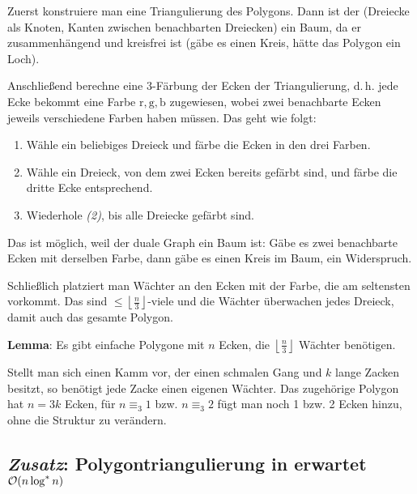 \begin{Beweis}
    Zuerst konstruiere man eine Triangulierung des Polygons.
    Dann ist der 
    (Dreiecke als Knoten, Kanten zwischen benachbarten Dreiecken) ein Baum,
    da er zusammenhängend und kreisfrei ist
    (gäbe es einen Kreis, hätte das Polygon ein Loch).

    Anschließend berechne eine $3$-Färbung der Ecken der Triangulierung,
    d.\,h. jede Ecke bekommt eine Farbe $\text{r}, \text{g}, \text{b}$ zugewiesen,
    wobei zwei benachbarte Ecken jeweils verschiedene Farben haben müssen.
    Das geht wie folgt:
    \begin{enumerate}
        \item
        Wähle ein beliebiges Dreieck und färbe die Ecken in den drei Farben.

        \item
        Wähle ein Dreieck, von dem zwei Ecken bereits gefärbt sind, und färbe die dritte Ecke
        entsprechend.

        \item
        Wiederhole \emph{(2)}, bis alle Dreiecke gefärbt sind.
    \end{enumerate}
    Das ist möglich, weil der duale Graph ein Baum ist:
    Gäbe es zwei benachbarte Ecken mit derselben Farbe, dann gäbe es einen Kreis im Baum,
    ein Widerspruch.

    Schließlich platziert man Wächter an den Ecken mit der Farbe, die am seltensten vorkommt.
    Das sind $\le \left\lfloor \frac{n}{3} \right\rfloor$-viele und die Wächter überwachen
    jedes Dreieck, damit auch das gesamte Polygon.
\end{Beweis}

\textbf{Lemma}:
Es gibt einfache Polygone mit $n$ Ecken,
die $\left\lfloor \frac{n}{3} \right\rfloor$ Wächter benötigen.

\begin{Beweis}
    Stellt man sich einen Kamm vor, der einen schmalen Gang und $k$ lange Zacken besitzt,
    so benötigt jede Zacke einen eigenen Wächter.
    Das zugehörige Polygon hat $n = 3k$ Ecken, für $n \equiv_3 1$ bzw. $n \equiv_3 2$
    fügt man noch 1 bzw. 2 Ecken hinzu, ohne die Struktur zu verändern.
\end{Beweis}

\pagebreak

\subsection{%
    \emph{Zusatz}: Polygontriangulierung in erwartet
    \texorpdfstring{$\mathcal{O}(n\log^\ast n)$}{O(n log* n)}%
}

